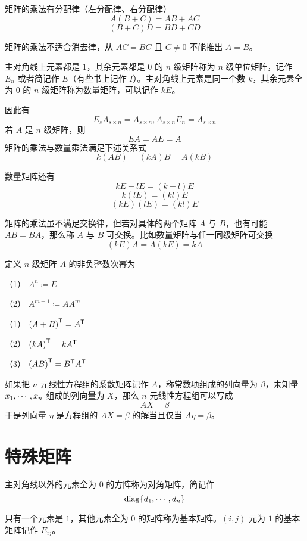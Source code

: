 \begin{theorem}
	矩阵的乘法有分配律（左分配律、右分配律）
	\[A(B+C) = AB+AC\]
	\[(B+C)D = BD + CD\]
\end{theorem}

矩阵的乘法不适合消去律，从 $AC = BC$ 且 $C\ne 0$ 不能推出 $A=B$。

主对角线上元素都是 $1$，其余元素都是 $0$ 的 $n$ 级矩阵称为 $n$ 级单位矩阵，记作 $E_n$ 或者简记作 $E$（有些书上记作 $I$）。主对角线上元素是同一个数 $k$，其余元素全为 $0$ 的 $n$ 级矩阵称为数量矩阵，可以记作 $kE$。

因此有
\[E_s A_{s \times n} = A_{s \times n}, A_{s \times n} E_n= A_{s \times n}\]
若 $A$ 是 $n$ 级矩阵，则
\[EA = AE = A\]
矩阵的乘法与数量乘法满足下述关系式
\[k(AB) = (kA)B = A(kB)\]

数量矩阵还有
\[kE + lE = (k+l)E\]
\[k(lE) = (kl)E\]
\[(kE)(lE) = (kl)E\]

矩阵的乘法虽不满足交换律，但若对具体的两个矩阵 $A$ 与 $B$，也有可能 $AB = BA$，那么称 $A$ 与 $B$ 可交换。比如数量矩阵与任一同级矩阵可交换
\[(kE)A = A(kE) = kA\]

\begin{definition}
	定义 $n$ 级矩阵 $A$ 的非负整数次幂为
	
	（1） $A^n \coloneqq  E$
	
	（2） $A^{m+1} \coloneqq  AA^m$
\end{definition}


\begin{theorem}
	（1） ${(A+B)}^\mathsf{T} = {A}^\mathsf{T}$
	
	（2） ${(kA)}^\mathsf{T} = k{A}^\mathsf{T}$
	
	（3） ${(AB)}^\mathsf{T} = {B}^\mathsf{T}{A}^\mathsf{T}$
\end{theorem}

如果把 $n$ 元线性方程组的系数矩阵记作 $A$，称常数项组成的列向量为 $\beta$，未知量 $x_1,\cdots,x_n$ 组成的列向量为 $X$，那么 $n$ 元线性方程组可以写成
\[AX = \beta\]
于是列向量 $\eta$ 是方程组的 $AX = \beta$ 的解当且仅当 $A\eta = \beta$。

\section{特殊矩阵}

\begin{definition}
	主对角线以外的元素全为 $0$ 的方阵称为对角矩阵，简记作
	\[\operatorname{diag}\{d_1,\cdots,d_n\}\]
\end{definition}

\begin{definition}
	只有一个元素是 $1$，其他元素全为 $0$ 的矩阵称为基本矩阵。$(i,j)$ 元为 $1$ 的基本矩阵记作 $E_{ij}$。
\end{definition}


